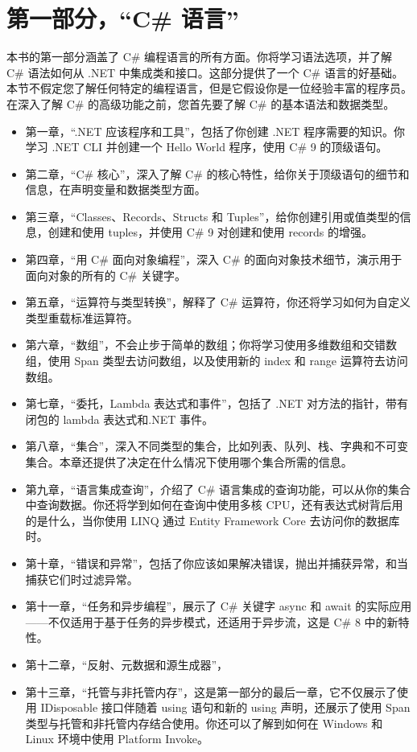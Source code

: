 \section*{第一部分，“C\# 语言”}
本书的第一部分涵盖了 C\# 编程语言的所有方面。你将学习语法选项，并了解 C\# 语法如何从 .NET 中集成类和接口。这部分提供了一个 C\# 语言的好基础。本节不假定您了解任何特定的编程语言，但是它假设你是一位经验丰富的程序员。在深入了解 C\# 的高级功能之前，您首先要了解 C\# 的基本语法和数据类型。
\begin{itemize}
    \item 第一章，“.NET 应该程序和工具”，包括了你创建 .NET 程序需要的知识。你学习 .NET CLI 并创建一个 Hello World 程序，使用 C\# 9 的顶级语句。
    \item 第二章，“C\# 核心”，深入了解 C\# 的核心特性，给你关于顶级语句的细节和信息，在声明变量和数据类型方面。
    \item 第三章，“Classes、Records、Structs 和 Tuples”，给你创建引用或值类型的信息，创建和使用 tuples，并使用 C\# 9 对创建和使用 records 的增强。
    \item 第四章，“用 C\# 面向对象编程”，深入 C\# 的面向对象技术细节，演示用于面向对象的所有的 C\# 关键字。
    \item 第五章，“运算符与类型转换”，解释了 C\# 运算符，你还将学习如何为自定义类型重载标准运算符。
    \item 第六章，“数组”，不会止步于简单的数组；你将学习使用多维数组和交错数组，使用 Span 类型去访问数组，以及使用新的 index 和 range 运算符去访问数组。
    \item 第七章，“委托，Lambda 表达式和事件”，包括了 .NET 对方法的指针，带有闭包的 lambda 表达式和.NET 事件。
    \item 第八章，“集合”，深入不同类型的集合，比如列表、队列、栈、字典和不可变集合。本章还提供了决定在什么情况下使用哪个集合所需的信息。
    \item 第九章，“语言集成查询”，介绍了 C\# 语言集成的查询功能，可以从你的集合中查询数据。你还将学到如何在查询中使用多核 CPU，还有表达式树背后用的是什么，当你使用 LINQ 通过 Entity Framework Core 去访问你的数据库时。
    \item 第十章，“错误和异常”，包括了你应该如果解决错误，抛出并捕获异常，和当捕获它们时过滤异常。
    \item 第十一章，“任务和异步编程”，展示了 C\# 关键字 async 和 await 的实际应用——不仅适用于基于任务的异步模式，还适用于异步流，这是 C\# 8 中的新特性。
    \item 第十二章，“反射、元数据和源生成器”，
    \item 第十三章，“托管与非托管内存”，这是第一部分的最后一章，它不仅展示了使用 IDisposable 接口伴随着 using 语句和新的 using 声明，还展示了使用 Span 类型与托管和非托管内存结合使用。你还可以了解到如何在 Windows 和 Linux 环境中使用 Platform Invoke。
\end{itemize}